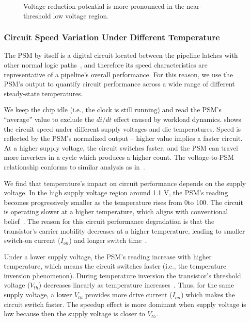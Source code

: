 \begin{figure}[t!]
\begin{minipage}{0.32\linewidth}
      \caption{Voltage reduction potential is more pronounced in the near-threshold low voltage region.}
      \label{fig:uv-potential} 
    \end{minipage}
\end{figure}

\subsubsection{Circuit Speed Variation Under Different Temperature}
\label{sec:temperature:characterize:psm}

The PSM by itself is a digital circuit located between the pipeline latches with other normal logic paths~\cite{sriram2016avfs}, and therefore its speed characteristics are representative of a pipeline's overall performance. For this reason, we use the PSM's output to quantify circuit performance across a wide range of different steady-state temperatures. 

We keep the chip idle (i.e., the clock is still running) and read the PSM's ``average'' value to exclude the $di/dt$ effect caused by workload dynamics.  shows the circuit speed under different supply voltages and die temperatures. Speed is reflected by the PSM's normalized output -- higher value implies a faster circuit. At a higher supply voltage, the circuit switches faster, and the PSM can travel more inverters in a cycle which produces a higher count. The voltage-to-PSM relationship conforms to similar analysis as in~\cite{zu2015adaptive}.

We find that temperature's impact on circuit performance depends on the supply voltage. In the high supply voltage region around 1.1 V, the PSM's reading becomes progressively smaller as the temperature rises from 0\C to 100\C. The circuit is operating slower at a higher temperature, which aligns with conventional belief~\cite{leng2015safe}. The reason for this circuit performance degradation is that the transistor's carrier mobility decreases at a higher temperature, leading to smaller switch-on current ($I_{on}$) and longer switch time~\cite{wolpert2012temperature}.

Under a lower supply voltage, the PSM's reading increase with higher temperature, which means the circuit switches faster (i.e., the temperature inversion phenomenon). During temperature inversion the transistor's threshold voltage ($V_{th}$) decreases linearly as temperature increases~\cite{wolpert2012temperature,park1995reversal,dasdan2006handling}. Thus, for the same supply voltage, a lower $V_{th}$ provides more drive current ($I_{on}$) which makes the circuit switch faster. The speedup effect is more dominant when supply voltage is low because then the supply voltage is closer to $V_{th}$.

